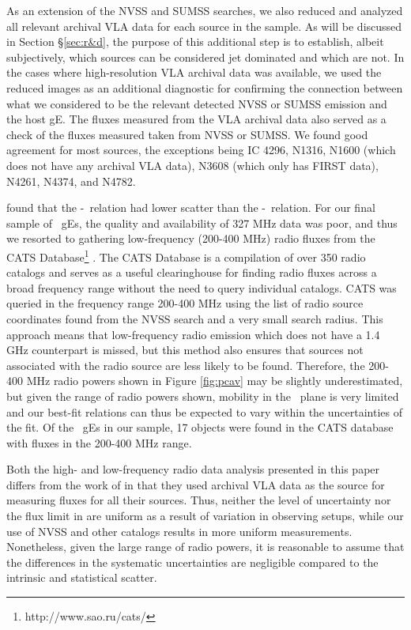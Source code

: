 \documentclass{emulateapj}
\begin{document}
As an extension of the NVSS and SUMSS searches, we also reduced and
analyzed all relevant archival VLA data for each source in the
sample. As will be discussed in Section \S\ref{sec:r&d}, the purpose
of this additional step is to establish, albeit subjectively, which
sources can be considered jet dominated and which are not. In the
cases where high-resolution VLA archival data was available, we used
the reduced images as an additional diagnostic for confirming the
connection between what we considered to be the relevant detected NVSS
or SUMSS emission and the host gE. The fluxes measured from the VLA
archival data also served as a check of the fluxes measured taken from
NVSS or SUMSS. We found good agreement for most sources, the
exceptions being IC 4296, N1316, N1600 (which does not have any
archival VLA data), N3608 (which only has FIRST data), N4261, N4374,
and N4782.

\citet{birzan08} found that the \pcav-\pthree\ relation had lower
scatter than the \pcav-\phigh\ relation. For our final sample of
\samp\ gEs, the quality and availability of 327 MHz data was poor, and
thus we resorted to gathering low-frequency (200-400 MHz) radio fluxes
from the CATS Database\footnote{http://www.sao.ru/cats/}
\citep{cats}. The CATS Database is a compilation of over 350 radio
catalogs and serves as a useful clearinghouse for finding radio fluxes
across a broad frequency range without the need to query individual
catalogs. CATS was queried in the frequency range 200-400 MHz using
the list of radio source coordinates found from the NVSS search and a
very small search radius. This approach means that low-frequency radio
emission which does not have a 1.4 GHz counterpart is missed, but this
method also ensures that sources not associated with the radio source
are less likely to be found. Therefore, the 200-400 MHz radio powers
shown in Figure \ref{fig:pcav} may be slightly underestimated, but
given the range of radio powers shown, mobility in the \radpow\ plane
is very limited and our best-fit relations can thus be expected to
vary within the uncertainties of the fit. Of the \samp\ gEs in our
sample, 17 objects were found in the CATS database with fluxes in the
200-400 MHz range.

Both the high- and low-frequency radio data analysis presented in this
paper differs from the work of \citet{birzan08} in that they used
archival VLA data as the source for measuring fluxes for all their
sources. Thus, neither the level of uncertainty nor the flux limit in
\citet{birzan08} are uniform as a result of variation in observing
setups, while our use of NVSS and other catalogs results in more
uniform measurements. Nonetheless, given the large range of radio
powers, it is reasonable to assume that the differences in the
systematic uncertainties are negligible compared to the intrinsic and
statistical scatter.
\end{document}
